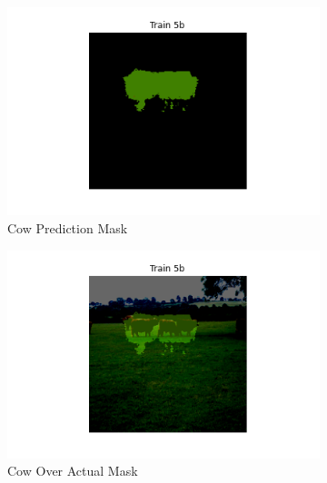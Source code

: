 \documentclass{article}
\begin{document}
\begin{figure}[h]
  \begin{subfigure}[b]{0.45\textwidth}
    \centering
    \includegraphics[width=\textwidth]{include/best model/cow1_pred.png}
    \caption{Cow Prediction Mask}
  \end{subfigure}
  \hfill %
  \begin{subfigure}[b]{0.45\textwidth}
    \centering
    \includegraphics[width=\textwidth]{include/best model/cow1_over_actual.png} %
    \caption{Cow Over Actual Mask}
  \end{subfigure}
  \begin{subfigure}[b]{0.45\textwidth}
    \centering

\end{subfigure}
\end{figure}
\end{document}
